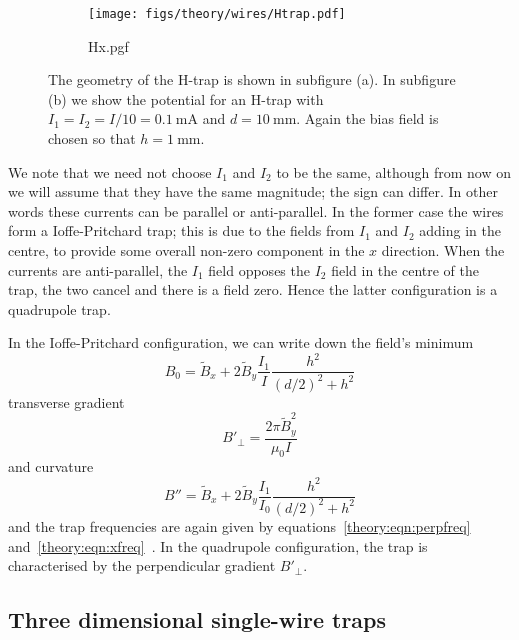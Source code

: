 \begin{figure}[htb]
  \centering
  \begin{subfigure}[b]{0.4\textwidth}
    \texttt{[image: figs/theory/wires/Htrap.pdf]}
  \end{subfigure}
  \begin{subfigure}[b]{0.4\textwidth}
    {Hx.pgf}
  \end{subfigure}
  \caption[H-trap]{The geometry of the H-trap is shown in subfigure (a). In subfigure
  (b) we show the potential for an H-trap with
  $I_1=I_2=I/10=\SI{0.1}{\milli\ampere}$ and $d=\SI{10}{\milli\meter}$. Again the bias field is chosen so
  that $h=\SI{1}{\milli\meter}$.}
  \label{theory:fig:Htrap}
\end{figure}

We note that we need not choose $I_1$ and $I_2$ to be the same, although from
now on we will assume that they have the same magnitude; the sign can differ.
In other words these currents can be parallel or anti-parallel. In the former
case the wires form a Ioffe-Pritchard trap; this is due to the fields from
$I_1$ and $I_2$ adding in the centre, to provide some overall non-zero
component in the $x$ direction. When the currents are anti-parallel, the $I_1$
field opposes the $I_2$ field in the centre of the trap, the two cancel and
there is a field zero. Hence the latter configuration is a quadrupole trap.

In the Ioffe-Pritchard configuration, we can write down the field's
minimum
%
\begin{equation}
  B_0 = \tilde{B}_x + 2\tilde{B}_y \frac{I_1}{I}\frac{h^2}{(d/2)^2 + h^2}
\end{equation}
%
transverse gradient
%
\begin{equation}
  B'_\perp = \frac{2\pi\tilde{B}_y^2}{\mu_0 I}
\end{equation}
%
and curvature~\cite{PhysRevA.79.013407}
%
\begin{equation}
  B'' = \tilde{B}_x + 2\tilde{B}_y\frac{I_1}{I_0}\frac{h^2}{(d/2)^2+h^2}
\end{equation}
%
and the trap frequencies are again given by equations~\ref{theory:eqn:perpfreq}
and~\ref{theory:eqn:xfreq}~\cite{PhysRevA.79.013407}. In the quadrupole
configuration, the trap is characterised by the perpendicular gradient
$B'_\perp$. 

\subsection{Three dimensional single-wire traps}

